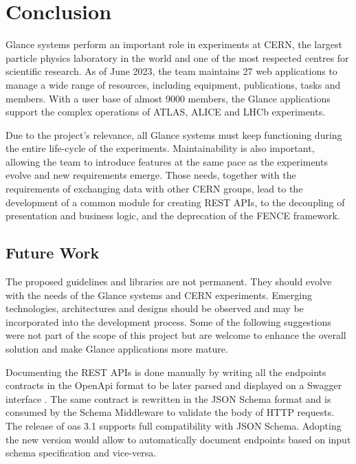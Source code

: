 \chapter{Conclusion}
\label{chap7}

Glance systems perform an important role in experiments at CERN, the largest particle physics laboratory in the world and one of the most respected centres for scientific research. As of June 2023, the team maintains 27 web applications to manage a wide range of resources, including equipment, publications, tasks and members. With a user base of almost 9000 members, the Glance applications support the complex operations of ATLAS, ALICE and LHCb experiments.

Due to the project's relevance, all Glance systems must keep functioning during the entire life-cycle of the experiments. Maintainability is also important, allowing the team to introduce features at the same pace as the experiments evolve and new requirements emerge. Those needs, together with the requirements of exchanging data with other CERN groups, lead to the development of a common module for creating REST APIs, to the decoupling of presentation and business logic, and the deprecation of the FENCE framework.


\section{Future Work}

The proposed guidelines and libraries are not permanent. They should evolve with the needs of the Glance systems and CERN experiments. Emerging technologies, architectures and designs should be observed and may be incorporated into the development process. Some of the following suggestions were not part of the scope of this project but are welcome to enhance the overall solution and make Glance applications more mature.

Documenting the REST APIs is done manually by writing all the endpoints contracts in the OpenApi \cite{open-api} format to be later parsed and displayed on a Swagger interface \cite{swagger-ui}. The same contract is rewritten in the JSON Schema \cite{json-schema-spec} format and is consumed by the Schema Middleware \cite{schema-middleware} to validate the body of HTTP requests. The release of \acrfull{oas} 3.1 \cite{oas-3.1} supports full compatibility with JSON Schema. Adopting the new version would allow to automatically document endpoints based on input schema specification and vice-versa.

